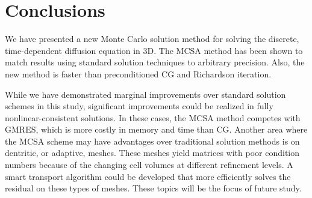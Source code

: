 \documentclass[preprint,12pt]{elsarticle}
\begin{document}
\section{Conclusions}
\label{sec:conclusions}

We have presented a new Monte Carlo solution method for solving the
discrete, time-dependent diffusion equation in 3D.  The MCSA method
has been shown to match results using standard solution techniques to
arbitrary precision.  Also, the new method is faster than
preconditioned CG and Richardson iteration.

While we have demonstrated marginal improvements over standard
solution schemes in this study, significant improvements could be
realized in fully nonlinear-consistent solutions.  In these cases, the
MCSA method competes with GMRES, which is more costly in memory and
time than CG.  Another area where the MCSA scheme may have advantages
over traditional solution methods is on dentritic, or adaptive,
meshes.  These meshes yield matrices with poor condition numbers
because of the changing cell volumes at different refinement levels.
A smart transport algorithm could be developed that more efficiently
solves the residual on these types of meshes.  These topics will be
the focus of future study.














\end{document}
